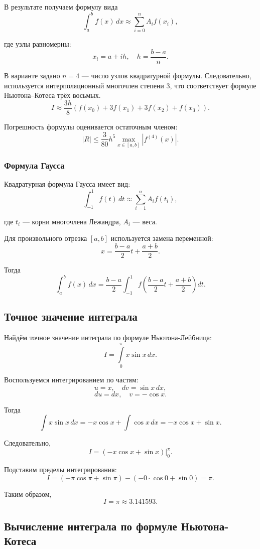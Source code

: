 В результате получаем формулу вида
\[
\int_a^b f(x)\,dx \approx \sum_{i=0}^{n} A_i f(x_i),
\]

где узлы равномерны:
\[
x_i = a + ih, \quad h = \frac{b-a}{n}.
\]

В варианте задано $n=4$ — число узлов квадратурной формулы.
Следовательно, используется интерполяционный многочлен степени $3$,
что соответствует формуле Ньютона–Котеса трёх восьмых.
\[
I \approx \frac{3h}{8}\left(f(x_0) + 3f(x_1) + 3f(x_2) + f(x_3)\right).
\]

Погрешность формулы оценивается остаточным членом:
\[
|R| \le \frac{3}{80} h^5 \max_{x \in [a,b]} |f^{(4)}(x)|.
\]

\subsubsection*{Формула Гаусса}

Квадратурная формула Гаусса имеет вид:
\[
\int_{-1}^{1} f(t)\,dt \approx \sum_{i=1}^{n} A_i f(t_i),
\]

где $t_i$ — корни многочлена Лежандра, $A_i$ — веса.

Для произвольного отрезка $[a,b]$ используется замена переменной:
\[
x = \frac{b-a}{2}t + \frac{a+b}{2}.
\]

Тогда
\[
\int_a^b f(x)\,dx = \frac{b-a}{2} \int_{-1}^{1} f\!\left(\frac{b-a}{2}t + \frac{a+b}{2}\right) dt.
\]

\subsection{Точное значение интеграла}

Найдём точное значение интеграла по формуле Ньютона-Лейбница:
\[
I=\int\limits_0^{\pi}x\sin x\,dx.
\]

Воспользуемся интегрированием по частям:
\[
u=x, \quad dv=\sin x\,dx,
\]
\[
du=dx, \quad v=-\cos x.
\]

Тогда
\[
\int x\sin x\,dx=-x\cos x+\int\cos x\,dx=-x\cos x+\sin x.
\]

Следовательно,
\[
I=\left(-x\cos x+\sin x\right)\Big|_0^{\pi}.
\]

Подставим пределы интегрирования:
\[
I=(-\pi\cos\pi+\sin\pi)-(-0\cdot\cos0+\sin0)=\pi.
\]

Таким образом,
\[
I=\pi\approx 3.141593.
\]

\subsection{Вычисление интеграла по формуле Ньютона-Котеса}

